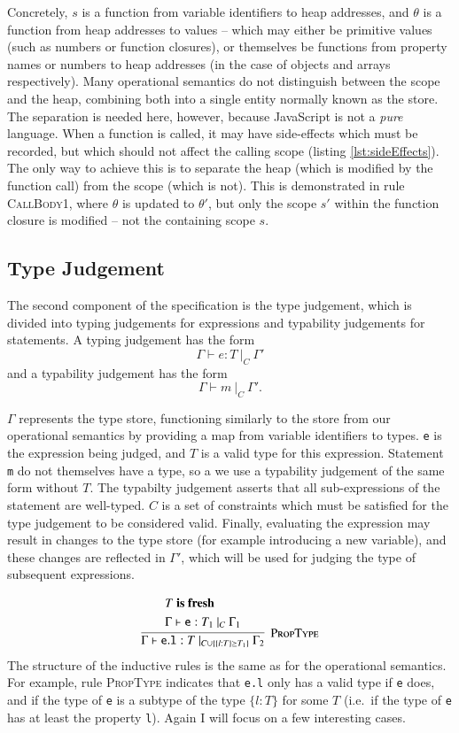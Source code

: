 \documentclass[12pt,a4paper,twoside,openright]{report}
\theoremstyle{definition}
\theoremstyle{dotless}
\newcommand*{\js}{\texttt}
\begin{document}
Concretely, $s$ is a function from variable identifiers to heap addresses, and
$\theta$ is a function from heap addresses to values -- which may either be
primitive values (such as numbers or function closures), or themselves be
functions from property names or numbers to heap addresses (in the case of
objects and arrays respectively). Many operational semantics do not distinguish
between the scope and the heap, combining both into a single entity normally
known as the store. The separation is needed here, however, because JavaScript
is not a \textit{pure} language. When a function is called, it may have
side-effects which must be recorded, but which should not affect the calling
scope (listing \ref{lst:sideEffects}). The only way to achieve this is to
separate the heap (which is modified by the function call) from the scope
(which is not). This is demonstrated in rule \textsc{CallBody1}, where $\theta$
is updated to $\theta'$, but only the scope $s'$ within the function closure is
modified -- not the containing scope $s$.

\subsection{Type Judgement}
The second component of the specification is the type judgement, which is
divided into typing judgements for expressions and typability judgements for
statements. A typing judgement has the form $$\Gamma\vdash e : T\ |_C\
\Gamma'$$ and a typability judgement has the form $$\Gamma \vdash m\ |_C\
\Gamma'.$$

$\Gamma$ represents the type store, functioning similarly to the store from our
operational semantics by providing a map from variable identifiers to types.
\js{e} is the expression being judged, and $T$ is a valid type for this
expression. Statement \js{m} do not themselves have a type, so a we use a
typability judgement of the same form without $T$. The typabilty judgement
asserts that all sub-expressions of the statement are well-typed. $C$ is a set
of constraints which must be satisfied for the type judgement to be considered
valid. Finally, evaluating the expression may result in changes to the type store (for
example introducing a new variable), and these changes are reflected in
$\Gamma'$, which will be used for judging the type of subsequent expressions.

$$\infer[\textsc{PropType}]{
  \Gamma \vdash \mathtt{e.l}:T\ |_{C\cup\{\{l:T\}\succeq T_1\}}\ \Gamma_2
}{\begin{split}
	&T \textbf{ is fresh} \\
	&\Gamma\vdash\mathtt{e}:T_1\ |_C\ \Gamma_1
  \end{split}}$$
The structure of the inductive rules is the same as for the operational
semantics. For example, rule \textsc{PropType} indicates that \js{e.l} only
has a valid type if \js{e} does, and if the type of \js{e} is a subtype
of the type $\{l: T\}$ for some $T$ (i.e.~if the type of \js{e} has at least the property
\js{l}). Again I will focus on a few interesting cases.
\end{document}
